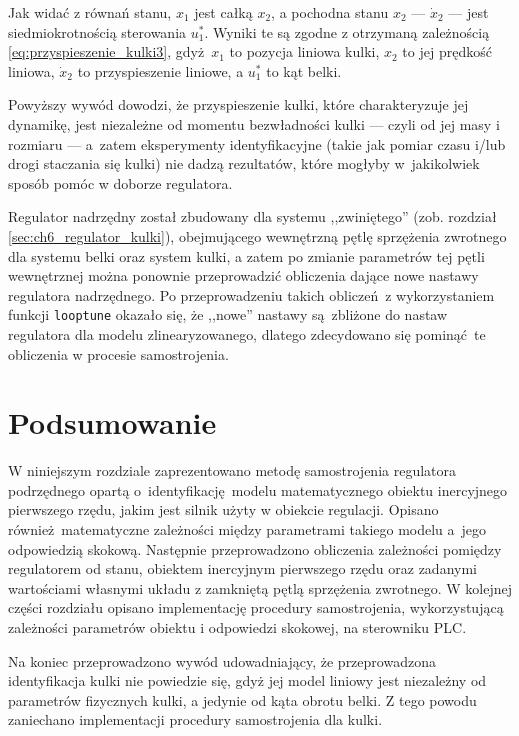 Jak widać z równań stanu, $x_1$ jest całką $x_2$, a pochodna stanu $x_2$ --- $\dot{x}_2$ --- jest siedmiokrotnością sterowania $u_1^*$. Wyniki te są zgodne z otrzymaną zależnością \eqref{eq:przyspieszenie_kulki3}, gdyż $x_1$ to pozycja liniowa kulki, $x_2$ to jej prędkość liniowa, $\dot{x}_2$ to przyspieszenie liniowe, a $u_1^*$ to kąt belki.

Powyższy wywód dowodzi, że przyspieszenie kulki, które charakteryzuje jej dynamikę, jest niezależne od momentu bezwładności kulki --- czyli od jej masy i rozmiaru --- a~zatem eksperymenty identyfikacyjne (takie jak pomiar czasu i/lub drogi staczania się kulki) nie dadzą rezultatów, które mogłyby w~jakikolwiek sposób pomóc w doborze regulatora.

Regulator nadrzędny został zbudowany dla systemu ,,zwiniętego'' (zob. rozdział \ref{sec:ch6_regulator_kulki}), obejmującego wewnętrzną pętlę sprzężenia zwrotnego dla systemu belki oraz system kulki, a zatem po zmianie parametrów tej pętli wewnętrznej można ponownie przeprowadzić obliczenia dające nowe nastawy regulatora nadrzędnego. Po przeprowadzeniu takich obliczeń z wykorzystaniem funkcji \texttt{looptune} okazało się, że ,,nowe'' nastawy są zbliżone do nastaw regulatora dla modelu zlinearyzowanego, dlatego zdecydowano się pominąć te obliczenia w procesie samostrojenia.

\section{Podsumowanie}

W niniejszym rozdziale zaprezentowano metodę samostrojenia regulatora podrzędnego opartą o~identyfikację modelu matematycznego obiektu inercyjnego pierwszego rzędu, jakim jest silnik użyty w obiekcie regulacji. Opisano również matematyczne zależności między parametrami takiego modelu a~jego odpowiedzią skokową. Następnie przeprowadzono obliczenia zależności pomiędzy regulatorem od stanu, obiektem inercyjnym pierwszego rzędu oraz zadanymi wartościami własnymi układu z zamkniętą pętlą sprzężenia zwrotnego. W kolejnej części rozdziału opisano implementację procedury samostrojenia, wykorzystującą zależności parametrów obiektu i odpowiedzi skokowej, na sterowniku PLC.

Na koniec przeprowadzono wywód udowadniający, że przeprowadzona identyfikacja kulki nie powiedzie się, gdyż jej model liniowy jest niezależny od parametrów fizycznych kulki, a jedynie od kąta obrotu belki. Z tego powodu zaniechano implementacji procedury samostrojenia dla kulki.

